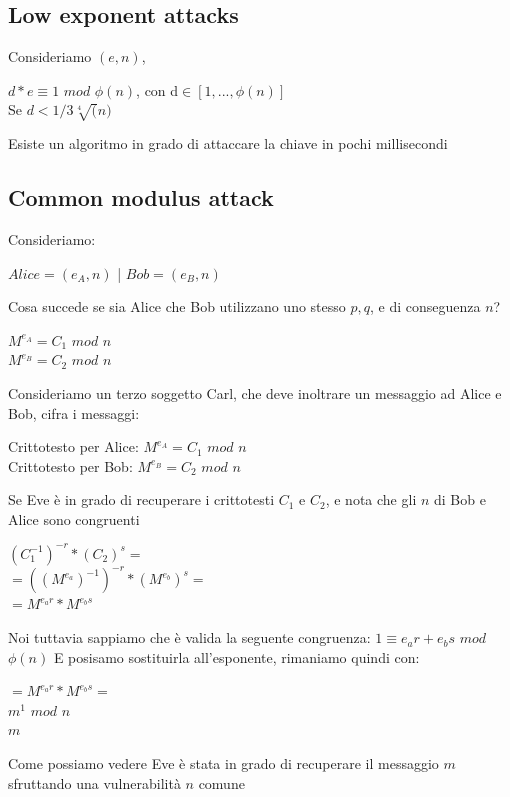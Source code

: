 \documentclass[11pt, oneside]{article}   	%
\begin{document}
\subsection*{Low exponent attacks}
Consideriamo $(e,n)$, \begin{center}
$d* e \equiv 1$ $mod$ $\phi(n)$, con d$\in [1, ..., \phi(n)]$\\
Se $d < 1/3\sqrt[4](n)$
\end{center} 
Esiste un algoritmo in grado di attaccare la chiave in pochi millisecondi

\subsection*{Common modulus attack}
Consideriamo:
\begin{center}
$Alice = (e_A, n)$ | $Bob = (e_B, n)$
\end{center}
Cosa succede se sia Alice che Bob utilizzano uno stesso $p,q$, e di conseguenza $n$?
\begin{center}
$M^{e_A} = C_1$ $mod$ $n$\\
$M^{e_B} = C_2$ $mod$ $n$
\end{center}
Consideriamo un terzo soggetto Carl, che deve inoltrare un messaggio ad Alice e Bob, cifra i messaggi:
\begin{center}
Crittotesto per Alice: $M^{e_A} = C_1$ $mod$ $n$\\
Crittotesto per Bob: $M^{e_B} = C_2$ $mod$ $n$
\end{center}
Se Eve è in grado di recuperare i crittotesti $C_1$ e $C_2$, e nota che gli $n$ di Bob e Alice sono congruenti
\begin{center}
$(C_1^{-1})^{-r} * (C_2)^s=$\\
$= ((M^{e_{a}})^{-1})^{-r} * (M^{e_b})^s =$\\
$= M^{e_{a}r} * M^{e_{b}s}$
\end{center}
Noi tuttavia sappiamo che è valida la seguente congruenza: $1 \equiv e_a r + e_b s$ $mod$ $\phi(n)$
E posisamo sostituirla all'esponente, rimaniamo quindi con:
\begin{center}
$= M^{e_{a}r} * M^{e_{b}s} =$\\
$m^1$ $mod$ $n$\\
$m$
\end{center}
Come possiamo vedere Eve è stata in grado di recuperare il messaggio $m$ sfruttando una vulnerabilità $n$ comune
\end{document}
